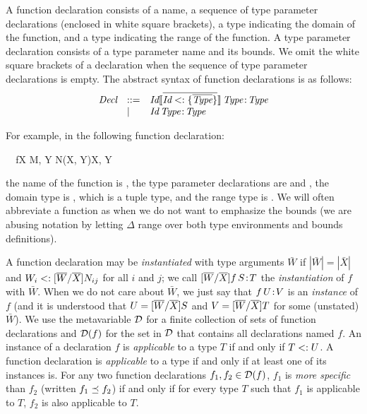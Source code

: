 A function declaration consists of 
a name, 
a sequence of type parameter declarations 
(enclosed in white square brackets), 
a type indicating the domain of the function, 
and a type indicating the range of the function.  
A type parameter declaration consists of
a type parameter name and its bounds.
We omit the white square brackets of a declaration 
when the sequence of type parameter declarations is empty.
The abstract syntax of function declarations is as follows:
\[
\begin{array}{lll}
\emph{Decl} &::=& 
\mbox{\ensuremath{\textit{Id} \llbracket {\ensuremath{\overline{{\textit{Id}} <: \{\overline{\textit{Type}}\}}}} \rrbracket\, \textit{Type}\!:\!\textit{Type}}}  \\
&\mid& 
\mbox{\ensuremath{{\textit{Id}}\,{\textit{Type}}\!:\!{\textit{Type}}}}
\end{array}
\]

For example, in the following function declaration:

\begin{FortressCode}
{\tt ~~}\+f\llbracket{}X \SHORTCUT{<} M, Y \SHORTCUT{<} N\rrbracket\bigl(\llbracket{}X\rrbracket, \llbracket{}Y\rrbracket\bigr)\COLON {}\llbracket{}X, Y\rrbracket\-
\end{FortressCode}
the name of the function is , 
the type parameter declarations are  and , 
the domain type is , which is a tuple type,
and the range type is . We will often abbreviate a function
as  when we do not want to emphasize the bounds (we are abusing notation by letting
$\Delta$ range over both type environments and bounds definitions).

A function declaration 
may be \emph{instantiated} with type arguments $\bar{W}$ 
if $|\bar{W}| = |\bar{X}|$ and $W_i <: [\overline{W}/\overline{X}] N_{ij}$ for all $i$ and $j$;
we call $[\overline{W}/\overline{X}] \mbox{\ensuremath{{f}\,{S}\!:\!{T}}}$
the \emph{instantiation} of $f$ with $\bar{W}$. 
When we do not care about $\bar{W}$, 
we just say that $\mbox{\ensuremath{{f}\,{U}\!:\!{V}}}$
is an \emph{instance} of $f$ (and it is understood that $U=[\overline{W}/\overline{X}]S$
and $V=[\overline{W}/\overline{X}]T$ for some (unstated) $\bar{W}$).
%
We use the metavariable $\mathcal{D}$ for a finite collection of sets of
function declarations and $\mathcal{D}(f)$ for the set in
$\mathcal{D}$ that contains all declarations named $f$.
%
An instance  of a declaration $f$ 
is \emph{applicable} to a type $T$ 
if and only if $T <: U$.
A function declaration is \emph{applicable} to a type 
if and only if at least one of its instances is.
%
For any two function declarations $f_1, f_2 \in \mathcal{D}(f)$, 
$f_1$ is \emph{more specific} than $f_2$ 
(written $f_1 \preceq f_2$)
if and only if for every type $T$ 
such that $f_1$ is applicable to $T$, 
$f_2$ is also applicable to $T$.



